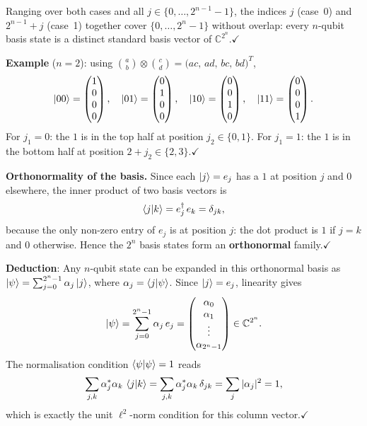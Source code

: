 \documentclass{ceri/sty/rapport}
\begin{document}
\begin{solution}
\medskip\noindent
Ranging over both cases and all $j\in\{0,\ldots,2^{n-1}-1\}$, the indices $j$ (case~0)
and $2^{n-1}+j$ (case~1) together cover $\{0,\ldots,2^n-1\}$ without overlap:
every $n$-qubit basis state is a distinct standard basis vector of $\mathbb{C}^{2^n}$.\quad$\checkmark$

\medskip\noindent
\textbf{Example} ($n=2$): using $\binom{a}{b}\otimes\binom{c}{d}=\bigl(ac,\,ad,\,bc,\,bd\bigr)^T$,
\[
  \ket{00}=\begin{pmatrix}1\\0\\0\\0\end{pmatrix},\quad
  \ket{01}=\begin{pmatrix}0\\1\\0\\0\end{pmatrix},\quad
  \ket{10}=\begin{pmatrix}0\\0\\1\\0\end{pmatrix},\quad
  \ket{11}=\begin{pmatrix}0\\0\\0\\1\end{pmatrix}.
\]
For $j_1=0$: the $1$ is in the top half at position $j_2\in\{0,1\}$.
For $j_1=1$: the $1$ is in the bottom half at position $2+j_2\in\{2,3\}$.\quad$\checkmark$

\medskip\noindent
\textbf{Orthonormality of the basis.}
Since each $\ket{j}=e_j$ has a $1$ at position $j$ and $0$ elsewhere,
the inner product of two basis vectors is
\[
  \braket{j|k} = e_j^\dagger\, e_k = \delta_{jk},
\]
because the only non-zero entry of $e_j$ is at position $j$: the dot product is $1$ if $j=k$ and $0$ otherwise.
Hence the $2^n$ basis states form an \textbf{orthonormal} family.\quad$\checkmark$

\medskip\noindent
\textbf{Deduction}: Any $n$-qubit state can be expanded in this orthonormal basis as
$\ket{\psi}=\sum_{j=0}^{2^n-1}\alpha_j\ket{j}$, where $\alpha_j=\braket{j|\psi}$.
Since $\ket{j}=e_j$, linearity gives
\[
  \ket{\psi}=\sum_{j=0}^{2^n-1}\alpha_j\,e_j
  =\begin{pmatrix}\alpha_0\\\alpha_1\\\vdots\\\alpha_{2^n-1}\end{pmatrix}\in\mathbb{C}^{2^n}.
\]
The normalisation condition $\braket{\psi|\psi}=1$ reads
\[
  \sum_{j,k}\alpha_j^*\alpha_k\,\braket{j|k}
  =\sum_{j,k}\alpha_j^*\alpha_k\,\delta_{jk}
  =\sum_j|\alpha_j|^2=1,
\]
which is exactly the unit $\ell^2$-norm condition for this column vector.\quad$\checkmark$
\end{solution}
\end{document}
